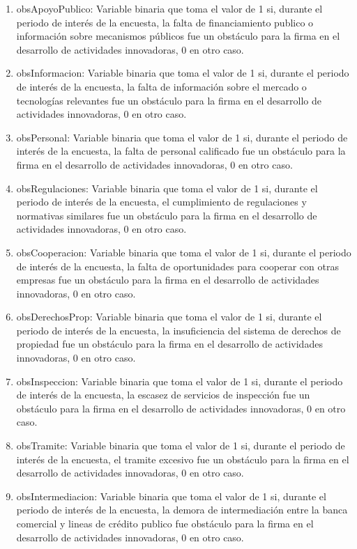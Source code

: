 \documentclass[12pt,a4paper]{article}
\begin{document}
\begin{enumerate}
	\item obsApoyoPublico: Variable binaria que toma el valor de 1 si, durante el periodo de interés de la encuesta, la falta de financiamiento publico o información sobre mecanismos públicos fue un obstáculo para la firma en el desarrollo de actividades innovadoras, 0 en otro caso.
	\item obsInformacion: Variable binaria que toma el valor de 1 si, durante el periodo de interés de la encuesta, la falta de información sobre el mercado o tecnologías relevantes fue un obstáculo para la firma en el desarrollo de actividades innovadoras, 0 en otro caso.
	\item obsPersonal: Variable binaria que toma el valor de 1 si, durante el periodo de interés de la encuesta, la falta de personal calificado fue un obstáculo para la firma en el desarrollo de actividades innovadoras, 0 en otro caso.
	\item obsRegulaciones: Variable binaria que toma el valor de 1 si, durante el periodo de interés de la encuesta, el cumplimiento de regulaciones y normativas similares fue un obstáculo para la firma en el desarrollo de actividades innovadoras, 0 en otro caso.
	\item obsCooperacion: Variable binaria que toma el valor de 1 si, durante el periodo de interés de la encuesta, la falta de oportunidades para cooperar con otras empresas fue un obstáculo para la firma en el desarrollo de actividades innovadoras, 0 en otro caso.
	\item obsDerechosProp: Variable binaria que toma el valor de 1 si, durante el periodo de interés de la encuesta, la insuficiencia del sistema de derechos de propiedad fue un obstáculo para la firma en el desarrollo de actividades innovadoras, 0 en otro caso.
	\item obsInspeccion: Variable binaria que toma el valor de 1 si, durante el periodo de interés de la encuesta, la escasez de servicios de inspección fue un obstáculo para la firma en el desarrollo de actividades innovadoras, 0 en otro caso.
	\item obsTramite: Variable binaria que toma el valor de 1 si, durante el periodo de interés de la encuesta, el tramite excesivo fue un obstáculo para la firma en el desarrollo de actividades innovadoras, 0 en otro caso.
	\item obsIntermediacion: Variable binaria que toma el valor de 1 si, durante el periodo de interés de la encuesta, la demora de intermediación entre la banca comercial y lineas de crédito publico fue obstáculo para la firma en el desarrollo de actividades innovadoras, 0 en otro caso.

\end{enumerate}
\end{document}
